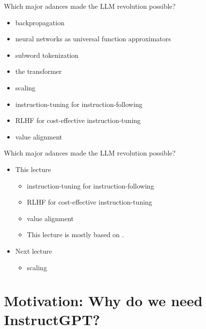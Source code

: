 \begin{vbframe}{Which major adances made the LLM revolution possible?}

\vfill

	\begin{itemize}
        \item backpropagation
		\item neural networks as universal function approximators
		\item subword tokenization
		\item the transformer
\item scaling
\item instruction-tuning for instruction-following
\item RLHF for cost-effective instruction-tuning
\item value alignment
	\end{itemize}

\vfill

\end{vbframe}
\begin{vbframe}{Which major adances made the LLM revolution possible?}


\vfill

	\begin{itemize}
        \item This lecture
	\begin{itemize}
\item instruction-tuning for instruction-following
\item RLHF for cost-effective instruction-tuning
\item value alignment
\item This lecture is mostly based on
\href{https://arxiv.org/abs/2203.02155}{}.
	\end{itemize}
        \item Next lecture
	\begin{itemize}
\item scaling
	\end{itemize}
	\end{itemize}

\vfill

\end{vbframe}







\section{Motivation: Why do we need InstructGPT?}


